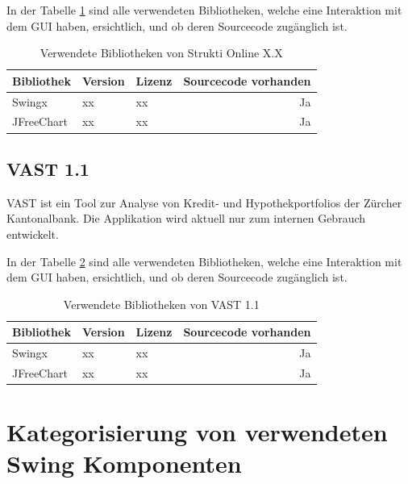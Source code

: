   In der Tabelle \ref{tab:bibliothekenStruktiOnline} sind alle verwendeten
  Bibliotheken, welche eine Interaktion mit dem \ac{GUI} haben, ersichtlich,
  und ob deren Sourcecode zugänglich ist.
  
  \begin{table}[ht]
    \begin{center}
      \begin{tabular}{lllr}
        \toprule
        Bibliothek & Version & Lizenz & Sourcecode vorhanden \\
        \midrule
        Swingx & xx & xx & Ja\\
        JFreeChart & xx & xx & Ja\\
        \bottomrule
      \end{tabular}
      \caption{Verwendete Bibliotheken von Strukti Online X.X}
      \label{tab:bibliothekenStruktiOnline}
    \end{center}
  \end{table}
  
  \subsection{VAST 1.1}
  
  VAST ist ein Tool zur Analyse von Kredit- und Hypothekportfolios der Zürcher
  Kantonalbank. Die Applikation wird aktuell nur zum internen Gebrauch
  entwickelt.
  
  In der Tabelle \ref{tab:bibliothekenVAST} sind alle verwendeten Bibliotheken,
  welche eine Interaktion mit dem \ac{GUI} haben, ersichtlich, und ob deren
  Sourcecode zugänglich ist.
  
  \begin{table}[ht]
    \begin{center}
      \begin{tabular}{lllr}
        \toprule
        Bibliothek & Version & Lizenz & Sourcecode vorhanden \\
        \midrule
        Swingx & xx & xx & Ja\\
        JFreeChart & xx & xx & Ja\\
        \bottomrule
      \end{tabular}
      \caption{Verwendete Bibliotheken von VAST 1.1}
      \label{tab:bibliothekenVAST}
    \end{center}
  \end{table}
  
  \section{Kategorisierung von verwendeten Swing Komponenten}